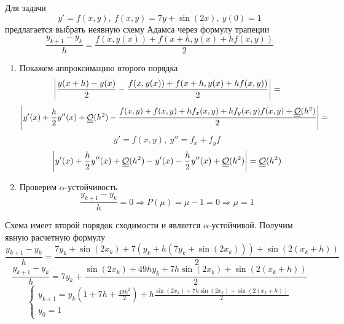 \begin{task}

  Для задачи
  \[y'=f(x,y),\ f(x,y)=7y+\sin(2x),\ y(0)=1\]
  предлагается выбрать неявную схему Адамса через формулу трапеции
  \[\frac{y_{k+1}-y_k}{h}=\frac{f(x, y(x))+f(x+h, y(x)+hf(x,y))}{2}\]

  \begin{enumerate}
    \item Покажем аппроксимацию второго порядка
          \[\left\lvert\frac{y(x+h)-y(x)}{2}-\frac{f(x,y(x))+f(x+h, y(x)+hf(x,y))}{2}\right\rvert=\]
          \[\left\lvert y'(x)+\frac{h}{2}y''(x)+\underline{\underline{\mathcal{O}}}(h^2)-\frac{f(x,y)+f(x,y)+hf_x(x,y)+hf_y(x,y)f(x,y)+\underline{\underline{\mathcal{O}}}(h^2)}{2}\right\rvert=\]
          \[y'=f(x,y),\ y'' = f_x + f_yf\]
          \[\left\lvert y'(x)+\frac{h}{2}y''(x)+\underline{\underline{\mathcal{O}}}(h^2)-y'(x)-\frac{h}{2}y''(x)+\underline{\underline{\mathcal{O}}}(h^2)\right\rvert=\underline{\underline{\mathcal{O}}}(h^2)\]
    \item Проверим $\alpha$-устойчивость
          \[\frac{y_{k+1}-y_k}{h}=0\Rightarrow P(\mu)=\mu-1=0\Rightarrow\mu=1\]
  \end{enumerate}
  Схема имеет второй порядок сходимости и является $\alpha$-устойчивой.
  Получим явную расчетную формулу
  \[\frac{y_{k+1}-y_k}{h}=\frac{7y_k + \sin(2x_k) + 7(y_k+h(7y_k + \sin(2x_k)))+\sin(2(x_k+h))}{2}\]
  \[\frac{y_{k+1}-y_k}{h}=7y_k+\frac{\sin(2x_k)+49hy_k + 7h\sin(2x_k)+\sin(2(x_k+h))}{2}\]
  \[\begin{cases}
      y_{k+1}=y_k\left(1+7h+\frac{49h^2}{2}\right)+h\frac{\sin(2x_k) + 7h\sin(2x_k)+\sin(2(x_k+h))}{2} \\
      y_0=1
    \end{cases}\]
\end{task}
